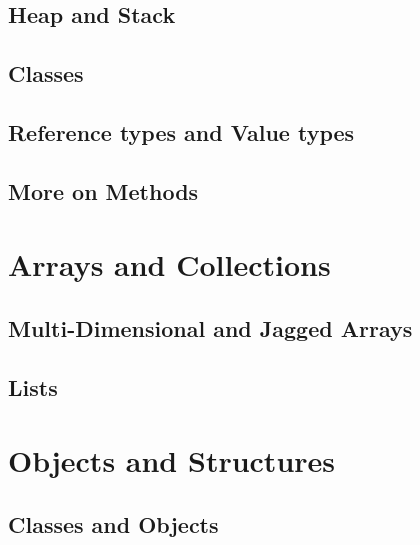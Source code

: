 \documentclass[
]{book}
\theoremstyle{definition}
\theoremstyle{definition}
\theoremstyle{definition}
\theoremstyle{remark}
\begin{document}
\hypertarget{heap-and-stack}{%
\section{Heap and Stack}\label{heap-and-stack}}

\hypertarget{classes}{%
\section{Classes}\label{classes}}

\hypertarget{reference-types-and-value-types}{%
\section{Reference types and Value types}\label{reference-types-and-value-types}}

\hypertarget{more-on-methods}{%
\section{More on Methods}\label{more-on-methods}}

\hypertarget{arrays-and-collections}{%
\chapter{Arrays and Collections}\label{arrays-and-collections}}

\hypertarget{multi-dimensional-and-jagged-arrays}{%
\section{Multi-Dimensional and Jagged Arrays}\label{multi-dimensional-and-jagged-arrays}}

\hypertarget{lists}{%
\section{Lists}\label{lists}}

\hypertarget{objects-and-structures}{%
\chapter{Objects and Structures}\label{objects-and-structures}}

\hypertarget{classes-and-objects}{%
\section{Classes and Objects}\label{classes-and-objects}}
\end{document}
